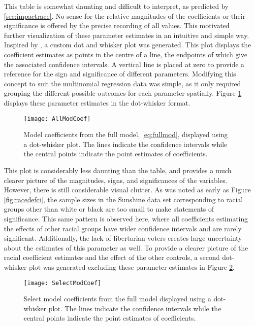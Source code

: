 This table is somewhat daunting and difficult to interpret, as predicted by \ref{sec:impactrace}. No sense for the relative
magnitudes of the coefficients or their significance is offered by the precise recording of all values. This motivated further
visualization of these parameter estimates in an intuitive and simple way. Inspired by \cite{dotwhisker}, a custom dot and
whisker plot was generated. This plot displays the coefficient estimates as points in the centre of a line, the endpoints of which
give the associated confidence intervals. A vertical line is placed at zero to provide a reference for the sign and significance
of different parameters. Modifying this concept to suit the multinomial regression data was simple, as it only required grouping
the different possible outcomes for each parameter spatially. Figure \ref{fig:modallcoef} displays these parameter estimates in
the dot-whisker format.

\begin{figure}[h!]
  \centering
  \texttt{[image: AllModCoef]}
  \caption[All Model Coefficients]{\footnotesize Model coefficients from the full model, \ref{eq:fullmod}, displayed using
    a dot-whisker plot. The lines indicate the confidence intervals while the central points indicate the point estimates of
    coefficients.}
  \label{fig:modallcoef}
\end{figure}

This plot is considerably less daunting than the table, and provides a much clearer picture of the magnitudes, signs, and
significances of the variables. However, there is still considerable visual clutter. As was noted as early as Figure
\ref{fig:racedefci}, the sample sizes in the Sunshine data set corresponding to racial groups other than white or black are too
small to make statements of significance. This same pattern is observed here, where all coefficients estimating the effects of
other racial groups have wider confidence intervals and are rarely significant. Additionally, the lack of libertarian voters
creates large uncertainty about the estimates of this parameter as well. To provide a clearer picture of the racial coefficient
estimates and the effect of the other controls, a second dot-whisker plot was generated excluding these parameter estimates in
Figure \ref{fig:modselcoef}.

\begin{figure}[h!]
  \centering
  \texttt{[image: SelectModCoef]}
  \caption[Select Model Coefficients]{\footnotesize Select model coefficients from the full model displayed using a dot-whisker
    plot. The lines indicate the confidence intervals while the central points indicate the point estimates of coefficients.}
  \label{fig:modselcoef}
\end{figure}

